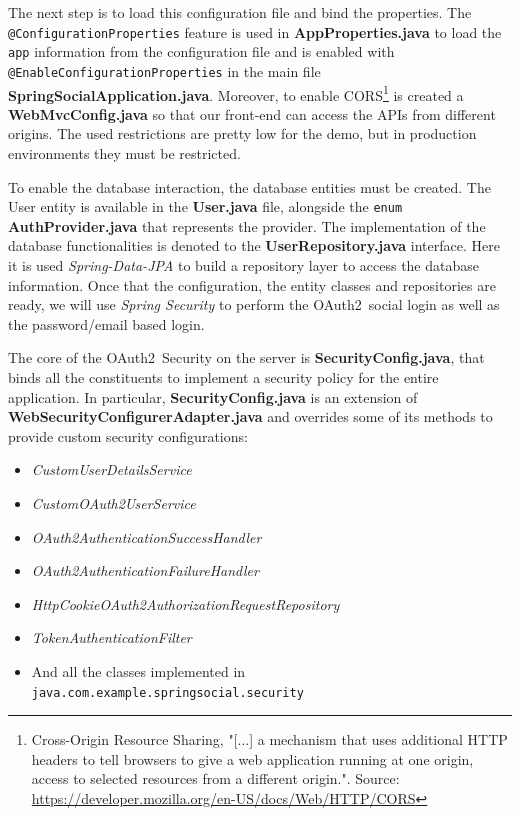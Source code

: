 \documentclass[a4paper,12pt]{article}
\def\oauth{OAuth2\xspace}
\begin{document}
The next step is to load this configuration file and bind the properties. The \\ \texttt{@ConfigurationProperties} feature is used in \textbf{AppProperties.java} to load the \texttt{app} information from the configuration file and is enabled with  \texttt{@EnableConfigurationProperties} in the main file \textbf{SpringSocialApplication.java}. Moreover, to enable CORS\footnote{Cross-Origin Resource Sharing, "[...] a mechanism that uses additional HTTP headers to tell browsers to give a web application running at one origin, access to selected resources from a different origin.". Source: \url{https://developer.mozilla.org/en-US/docs/Web/HTTP/CORS}} is created a \textbf{WebMvcConfig.java}  so that our front-end can access the APIs from different origins. The used restrictions are pretty low for the demo, but in production environments they must be restricted.

To enable the database interaction, the database entities must be created. The User entity is available in the \textbf{User.java} file, alongside the \texttt{enum} \textbf{AuthProvider.java} that represents the provider. The implementation of the database functionalities is denoted to the \textbf{UserRepository.java} interface. Here it is used \textit{Spring-Data-JPA} to build a repository layer to access the database information.
Once that the configuration, the entity classes and repositories are ready, we will use \textit{Spring Security} \cite{sprsec} to perform the \oauth\ social login as well as the password/email based login.

The core of the \oauth\ Security on the server is \textbf{SecurityConfig.java}, that binds all the constituents to implement a security policy for the entire application. In particular, \textbf{SecurityConfig.java} is an extension of \textbf{WebSecurityConfigurerAdapter.java} and overrides some of its methods to provide custom security configurations:

\begin{itemize}
    \item \textit{CustomUserDetailsService}
    \item \textit{CustomOAuth2UserService}
    \item \textit{OAuth2AuthenticationSuccessHandler}
    \item \textit{OAuth2AuthenticationFailureHandler}
    \item \textit{HttpCookieOAuth2AuthorizationRequestRepository}
    \item \textit{TokenAuthenticationFilter}
    \item And all the classes implemented in \texttt{java.com.example.springsocial.security}
\end{itemize}
\end{document}
